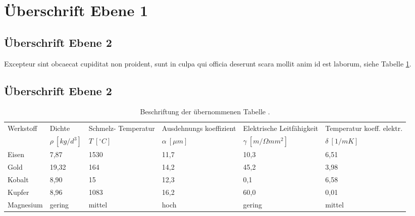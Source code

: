 \section{Überschrift Ebene 1}

\lipsum[1][1-5]

\subsection{Überschrift Ebene 2}

\lipsum[2]
Excepteur sint obcaecat cupiditat non proident, sunt
in culpa qui officia deserunt \ac{scara} mollit anim id est laborum, siehe Tabelle \ref{tab:Tabelle2}.

\subsection{Überschrift Ebene 2}

\lipsum[4]

\begin{table}[H]
    \footnotesize
    \centering
    \setlength{\arrayrulewidth}{0.1mm}
    \setlength{\tabcolsep}{8pt}
    \renewcommand{\arraystretch}{1.8}
    \begin{tabular}{ |p{2cm}|p{2cm}|p{2cm}|p{2cm}|p{2cm}|p{2cm}| }
        \hline
        Werkstoff & Dichte          & Schmelz- Temperatur & Ausdehnungs koeffizient & Elektrische Leitfähigkeit & Temperatur koeff. elektr. \\
        ~         & $\rho~[kg/d^3]$ & $T~[^\circ C]$      & $\alpha~[\mu m]$        & $\gamma~[m/\Omega mm^2]$  & $\delta~[1/mK]$           \\
        \hline
        Eisen     & 7,87            & 1530                & 11,7                    & 10,3                      & 6,51                      \\
        Gold      & 19,32           & 164                 & 14,2                    & 45,2                      & 3,98                      \\
        Kobalt    & 8,90            & 15                  & 12,3                    & 0,1                       & 6,58                      \\
        Kupfer    & 8,96            & 1083                & 16,2                    & 60,0                      & 0,01                      \\
        Magnesium & gering          & mittel              & hoch                    & gering                    & mittel                    \\
        \hline
    \end{tabular}
    \caption{Beschriftung der übernommenen Tabelle  \cite{datasheet:can}.}
    \label{tab:Tabelle2}
\end{table}
